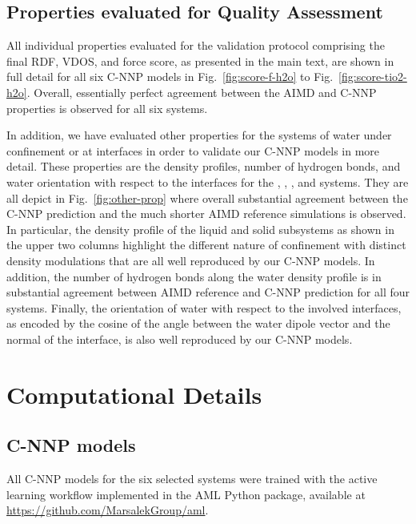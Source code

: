 \documentclass[aip,jcp,amsmath,amssymb,floatfix,reprint,citeautoscript,noeprint]{revtex4-1}
\begin{document}
\begin{bibunit}
%
\subsection*{Properties evaluated for Quality Assessment}
\label{subsec:prop}
%

All individual properties evaluated for the validation protocol
comprising the final RDF, VDOS, and force score, as presented in the main text,
are shown in full detail for all six C-NNP models
in Fig.~\ref{fig:score-f-h2o} to Fig.~\ref{fig:score-tio2-h2o}.
%
Overall, essentially perfect agreement between
the AIMD and C-NNP properties is observed for
all six systems.
%

In addition, we have evaluated other properties
for the systems of water under confinement or at interfaces
in order to validate our C-NNP models in more detail.
%
These properties are the density profiles, number of hydrogen bonds, and water orientation
with respect to the interfaces for the , , ,
and  systems.
%
They are all depict in Fig.~\ref{fig:other-prop} where overall substantial agreement
between the C-NNP prediction and the much shorter AIMD reference simulations is observed.
%
In particular, the density profile of the liquid and solid subsystems
as shown in the upper two columns highlight the different nature of
confinement with distinct density modulations that are all well reproduced
by our C-NNP models.
%
In addition, the number of hydrogen bonds along the water density
profile is in substantial agreement between AIMD reference and C-NNP prediction
for all four systems.
%
Finally, the orientation of water with respect to the involved interfaces,
as encoded by the cosine of the angle between the water dipole vector
and the normal of the interface, is also well reproduced by our C-NNP models.


%
\section*{Computational Details}
\label{sec:comp-det}
%


%
\subsection*{C-NNP models}
\label{subsec:c-nnp}
%

All C-NNP models for the six selected systems
were trained with the active learning workflow implemented
in the AML Python package, available
at \url{https://github.com/MarsalekGroup/aml}.
%


\end{bibunit}
\end{document}
